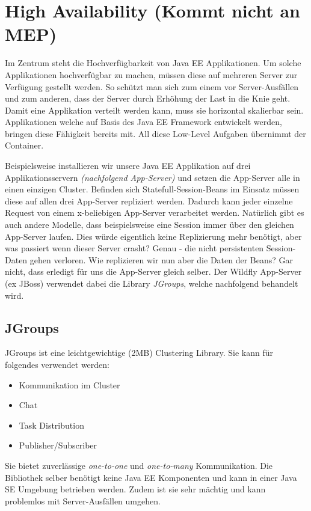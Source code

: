 \chapter{High Availability (Kommt nicht an MEP)}
Im Zentrum steht die Hochverfügbarkeit von Java EE Applikationen. Um solche Applikationen hochverfügbar zu machen, müssen diese auf mehreren Server zur Verfügung gestellt werden. So schützt man sich zum einem vor Server-Ausfällen und zum anderen, dass der Server durch Erhöhung der Last in die Knie geht. Damit eine Applikation verteilt werden kann, muss sie horizontal skalierbar sein. Applikationen welche auf Basis des Java EE Framework entwickelt werden, bringen diese Fähigkeit bereits mit. All diese Low-Level Aufgaben übernimmt der Container.

Beispielsweise installieren wir unsere Java EE Applikation auf drei Applikationsservern \emph{(nachfolgend App-Server)} und setzen die App-Server alle in einen einzigen Cluster. Befinden sich Statefull-Session-Beans im Einsatz müssen diese auf allen drei App-Server repliziert werden. Dadurch kann jeder einzelne Request von einem x-beliebigen App-Server verarbeitet werden. Natürlich gibt es auch andere Modelle, dass beispielsweise eine Session immer über den gleichen App-Server laufen. Dies würde eigentlich keine Replizierung mehr benötigt, aber was passiert wenn dieser Server crasht? Genau - die nicht persistenten Session-Daten gehen verloren. Wie replizieren wir nun aber die Daten der Beans? Gar nicht, dass erledigt für uns die App-Server gleich selber. Der Wildfly App-Server (ex JBoss) verwendet dabei die Library \emph{JGroups}, welche nachfolgend behandelt wird.

\section{JGroups}
JGroups ist eine leichtgewichtige (2MB) Clustering Library. Sie kann für folgendes verwendet werden: 
\begin{itemize}
	\item Kommunikation im Cluster
	\item Chat
	\item Task Distribution
	\item Publisher/Subscriber
\end{itemize}
Sie bietet zuverlässige \emph{one-to-one} und \emph{one-to-many} Kommunikation. Die Bibliothek selber benötigt keine Java EE Komponenten und kann in einer Java SE Umgebung betrieben werden. Zudem ist sie sehr mächtig und kann problemlos mit Server-Ausfällen umgehen.


